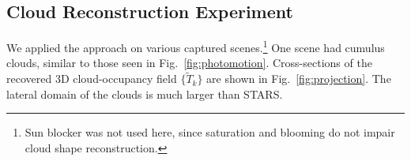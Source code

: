 \documentclass[runningheads]{llncs}
\begin{document}
\subsection*{Cloud Reconstruction Experiment}
\label{sec:results}

We applied the approach on various captured scenes.\footnote{Sun blocker was not used here, since saturation and blooming do not impair cloud shape reconstruction.} One scene had cumulus clouds, similar to those seen in Fig.~\ref{fig:photomotion}.
%
%
Cross-sections of the recovered 3D cloud-occupancy field $\{\tilde T_k\}$ are shown in Fig.~\ref{fig:projection}. The lateral domain of the clouds is much larger than STARS.
\end{document}

